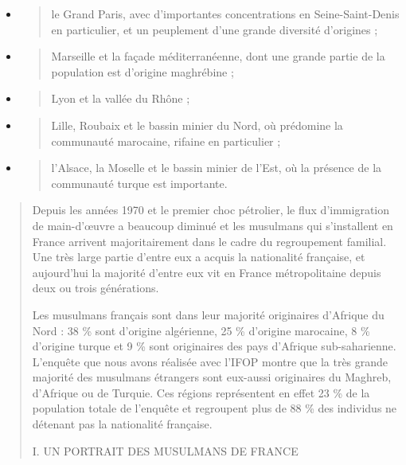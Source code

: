 \begin{itemize}
\item
  \begin{quote}
  le Grand Paris, avec d'importantes concentrations en Seine-Saint-Denis
  en particulier, et un peuplement d'une grande diversité d'origines ;
  \end{quote}
\item
  \begin{quote}
  Marseille et la façade méditerranéenne, dont une grande partie de la
  population est d'origine maghrébine ;
  \end{quote}
\item
  \begin{quote}
  Lyon et la vallée du Rhône ;
  \end{quote}
\item
  \begin{quote}
  Lille, Roubaix et le bassin minier du Nord, où prédomine la communauté
  marocaine, rifaine en particulier ;
  \end{quote}
\item
  \begin{quote}
  l'Alsace, la Moselle et le bassin minier de l'Est, où la présence de
  la communauté turque est importante.
  \end{quote}
\end{itemize}

\begin{quote}
Depuis les années 1970 et le premier choc pétrolier, le flux
d'immigration de main-d'œuvre a beaucoup diminué et les musulmans qui
s'installent en France arrivent majoritairement dans le cadre du
regroupement familial. Une très large partie d'entre eux a acquis la
nationalité française, et aujourd'hui la majorité d'entre eux vit en
France métropolitaine depuis deux ou trois générations.

Les musulmans français sont dans leur majorité originaires d'Afrique du
Nord : 38 \% sont d'origine algérienne, 25 \% d'origine marocaine, 8 \%
d'origine turque et 9 \% sont originaires des pays d'Afrique
sub-saharienne. L'enquête que nous avons réalisée avec l'IFOP montre que
la très grande majorité des musulmans étrangers sont eux-aussi
originaires du Maghreb, d'Afrique ou de Turquie. Ces régions
représentent en effet 23 \% de la population totale de l'enquête et
regroupent plus de 88 \% des individus ne détenant pas la nationalité
française.

I. UN PORTRAIT DES MUSULMANS DE FRANCE
\end{quote}

